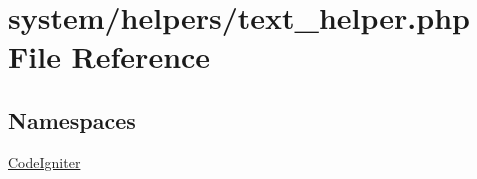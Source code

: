 \hypertarget{text__helper_8php}{}\section{system/helpers/text\+\_\+helper.php File Reference}
\label{text__helper_8php}
\subsection*{Namespaces}
\begin{DoxyCompactItemize}
\item 
 \mbox{\hyperlink{namespace_code_igniter}{Code\+Igniter}}
\end{DoxyCompactItemize}
